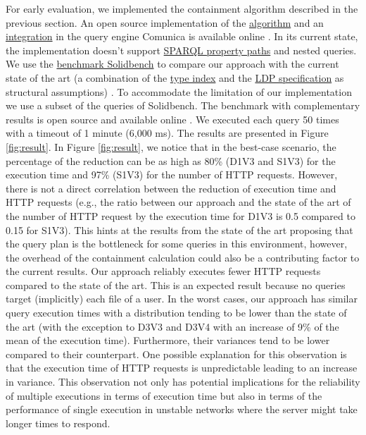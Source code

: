 For early evaluation, we implemented the containment algorithm described in the previous section.
An open source implementation of the \href{https://github.com/constraintAutomaton/query-shape-detection}{algorithm} and an 
\href{https://github.com/constraintAutomaton/comunica-feature-link-traversal/tree/feature/shapeIndex}{integration} in the query engine 
Comunica \cite{taelman_iswc_resources_comunica_2018} is available online .
In its current state, the implementation doesn't support 
\href{https://www.w3.org/TR/sparql11-query/#propertypaths}{SPARQL property paths} and nested queries.
We use the \href{https://github.com/SolidBench/SolidBench.js}{benchmark Solidbench} \cite{Taelman2023} to compare our approach with the current state of the art 
(a combination of the \href{https://solid.github.io/type-indexes/}{type index} and the \href{https://www.w3.org/TR/ldp/}{LDP specification} as structural assumptions) \cite{Taelman2023}.
To accommodate the limitation of our implementation we use a subset of the queries of Solidbench.
The benchmark with complementary results is open source and available online .
We executed each query 50 times with a timeout of 1 minute (6,000 ms).
The results are presented in Figure \ref{fig:result}.
In Figure \ref{fig:result}, we notice that in the best-case scenario, the percentage of the reduction can be as high as 80\% (D1V3 and S1V3) for the execution time 
and 97\% (S1V3) for the number of HTTP requests.
However, there is not a direct correlation between the reduction of execution time and HTTP requests (e.g., the ratio 
between our approach and the state of the art of the number of HTTP request by the execution time for D1V3 is 0.5 compared to 0.15 for S1V3).
This hints at the results from the state of the art \cite{Taelman2023} proposing that the query plan is the bottleneck for some queries in this environment,
however, the overhead of the containment calculation could also be a contributing factor to the current results.
Our approach reliably executes fewer HTTP requests compared to the state of the art.
This is an expected result because no queries target (implicitly) each file of a user.
In the worst cases, our approach  has similar query execution times with a 
distribution tending to be lower than the state of the art (with the exception to D3V3 and D3V4 with an increase of 9\% of the mean of the execution time).
Furthermore, their variances tend to be lower compared to their counterpart. 
One possible explanation for this observation is that the execution time of HTTP requests is unpredictable \cite{hartig2016walking}
leading to an increase in variance.
This observation not only has potential implications for the reliability of multiple executions in terms of execution time
but also in terms of the performance of single execution in unstable networks where the server might take longer times to respond. 
